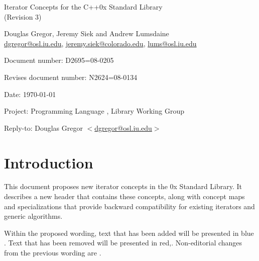 \documentclass[american,twoside]{book}
\begin{document}
\raggedbottom

\begin{titlepage}
\begin{center}
\huge
Iterator Concepts for the C++0x Standard Library\\
(Revision 3)
\vspace{0.5in}

\normalsize
Douglas Gregor, Jeremy Siek and Andrew Lumsdaine \\
\href{mailto:dgregor@osl.iu.edu}{dgregor@osl.iu.edu}, \href{mailto:jeremy.siek@colorado.edu}{jeremy.siek@colorado.edu}, \href{mailto:lums@osl.iu.edu}{lums@osl.iu.edu}
\end{center}

\vspace{1in}
\par\noindent Document number: D2695=08-0205 \vspace{-6pt}
\par\noindent Revises document number: N2624=08-0134 \vspace{-6pt}
\par\noindent Date: \today\vspace{-6pt}
\par\noindent Project: Programming Language \Cpp{}, Library Working Group\vspace{-6pt}
\par\noindent Reply-to: Douglas Gregor $<$\href{mailto:dgregor@osl.iu.edu}{dgregor@osl.iu.edu}$>$\vspace{-6pt}

\section*{Introduction}
This document proposes new iterator concepts in the \Cpp0x Standard
Library. It describes a new header  that
contains these concepts, along with concept maps and
 specializations that provide backward
compatibility for existing iterators and generic algorithms.

Within the proposed wording, text that has been added
\textcolor{addclr}{will be presented in blue} . Text that has been removed will be
presented \textcolor{remclr}{in red},. Non-editorial
changes from the previous wording are . 



\end{titlepage}
\end{document}
